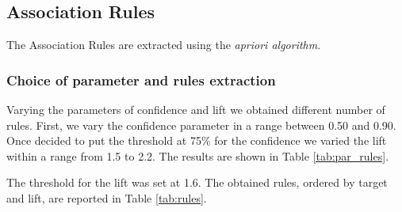 \documentclass[a4paper,11pt,dvipsnames]{article}
\begin{document}
\subsection{Association Rules}
The Association Rules are extracted using the \textit{apriori algorithm}.
\subsubsection{Choice of parameter and rules extraction}
Varying the parameters of confidence and lift we obtained different number of rules. First, we vary the confidence parameter in a range between 0.50 and 0.90. Once decided to put the threshold at 75\% for the confidence we varied the lift within a range from 1.5 to 2.2. The results are shown in Table \ref{tab:par_rules}.


The threshold for the lift was set at 1.6. The obtained rules, ordered by target and lift, are reported in Table \ref{tab:rules}.
\end{document}
